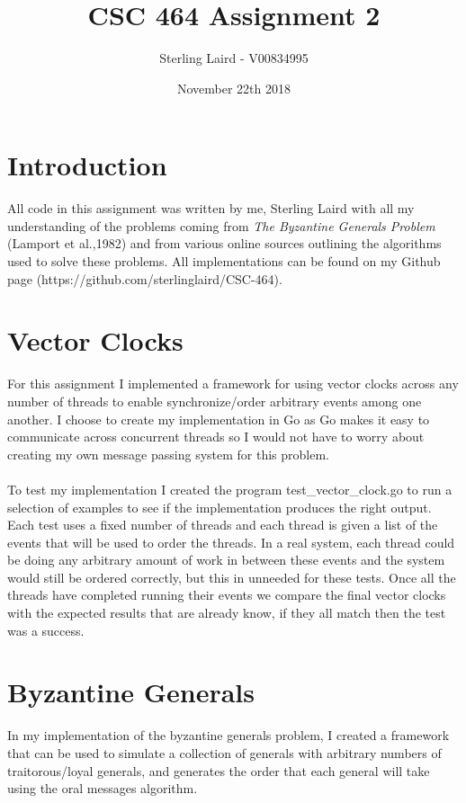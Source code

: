 \documentclass[11pt]{article}
\title{CSC 464 Assignment 2}
\author{Sterling Laird - V00834995}
\date{November 22th 2018}
\begin{document}
\maketitle

\section{Introduction}
All code in this assignment was written by me, Sterling Laird with all my understanding of the problems coming from \textit{The Byzantine Generals Problem} (Lamport et al.,1982) and from various online sources outlining the algorithms used to solve these problems. All implementations can be found on my Github page \newline(https://github.com/sterlinglaird/CSC-464).\\


\pagebreak

\section{Vector Clocks}
For this assignment I implemented a framework for using vector clocks across any number of threads to enable synchronize/order arbitrary events among one another. I choose to create my implementation in Go as Go makes it easy to communicate across concurrent threads so I would not have to worry about creating my own message passing system for this problem.\\
\\

To test my implementation I created the program test\_vector\_clock.go to run a selection of examples to see if the implementation produces the right output. Each test uses a fixed number of threads and each thread is given a list of the events that will be used to order the threads. In a real system, each thread could be doing any arbitrary amount of work in between these events and the system would still be ordered correctly, but this in unneeded for these tests. Once all the threads have completed running their events we compare the final vector clocks with the expected results that are already know, if they all match then the test was a success.

\pagebreak

\section{Byzantine Generals}
In my implementation of the byzantine generals problem, I created a framework that can be used to simulate a collection of generals with arbitrary numbers of traitorous/loyal generals, and generates the order that each general will take using the oral messages algorithm.\\
\\
\end{document}
